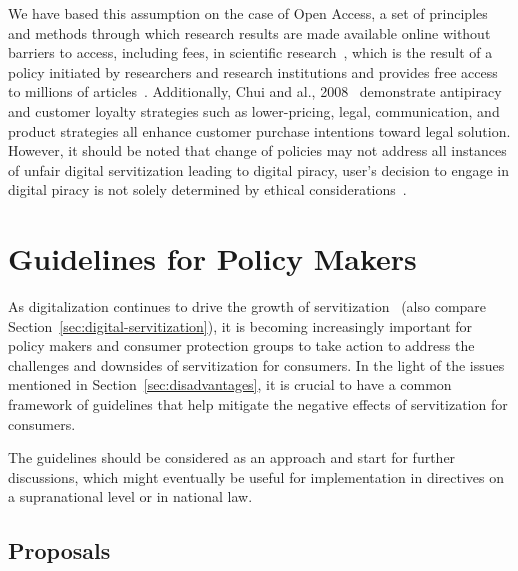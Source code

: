 \documentclass[sigplan,screen,nonacm]{acmart}
\begin{document}
We have based this assumption on the case of Open Access, a set of principles and methods through which research results are made available online without barriers to access, including fees, in scientific research~\cite{suber2012open}, which is the result of a policy initiated by researchers and research institutions and provides free access to millions of articles~\cite{bodo2016pirates, lawson2017access, sanchez2016sci}. Additionally, Chui and al., 2008~\cite{chiu2008encourage} demonstrate antipiracy and customer loyalty strategies such as lower-pricing, legal, communication, and product strategies all enhance customer purchase intentions toward legal solution. However, it should be noted that change of policies may not address all instances of unfair digital servitization leading to digital piracy, user's decision to engage in digital piracy is not solely determined by ethical considerations~\cite{riekkinen2018piracy}.



\section{Guidelines for Policy Makers}
As digitalization continues to drive the growth of servitization~\cite{mosch2021trapped, ritter2020digitization} (also compare Section~\ref{sec:digital-servitization}), 
it is becoming increasingly important for policy makers and consumer protection groups to take action to address the challenges and downsides of servitization for consumers. 
In the light of the issues mentioned in Section~\ref{sec:disadvantages}, it is crucial to have a common framework of guidelines that help mitigate the negative effects of servitization for consumers.

The guidelines should be considered as an approach and start for further discussions, which might eventually be useful for implementation in directives on a supranational level or in national law. 


\subsection{Proposals}
\end{document}
